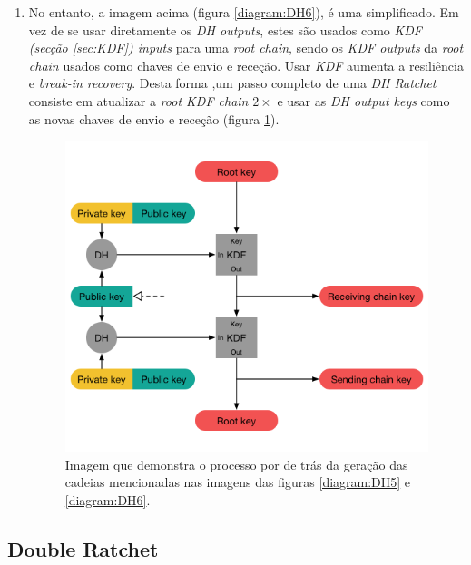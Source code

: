 \begin{enumerate}
    \item No entanto, a imagem acima (figura \ref{diagram:DH6}), é uma simplificado. Em vez de se usar diretamente os \textit{DH outputs}, estes são usados como \textit{KDF (secção \ref{sec:KDF}) inputs} para uma \textit{root chain}, sendo os \textit{KDF outputs} da \textit{root chain} usados como chaves de envio e receção. Usar \textit{KDF} aumenta a resiliência e \textit{break-in recovery}.
    Desta forma ,um passo completo de uma \textit{DH Ratchet} consiste em atualizar a \textit{root KDF chain} $2\times$ e usar as \textit{DH output keys} como as novas chaves de envio e receção (figura \ref{diagram:DH7}).

    \begin{figure}[H]
        \begin{center}
            \includegraphics[width=12cm]{img/DH7.png}
            \caption{Imagem que demonstra o processo por de trás da geração das cadeias mencionadas nas imagens das figuras \ref{diagram:DH5} e \ref{diagram:DH6}.}
            \label{diagram:DH7}
        \end{center}
    \end{figure}
    
\end{enumerate}

\subsection{Double Ratchet}\label{sec:DoubleRatchet}
